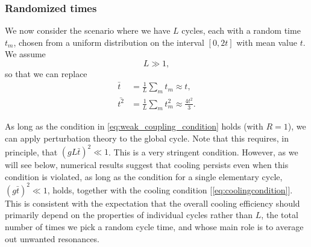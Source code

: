 \documentclass[aps,prx,twocolumn,superscriptaddress,nofootinbib,nolongbibliography,nobalancelastpage,10pt,floatfix]{revtex4-2}
\begin{document}
\subsubsection{Randomized times}
\label{subsubsec:randomized_times}

We now consider the scenario where we have $L$ cycles, each with a random time $t_m$, chosen from a uniform distribution on the interval $[0,2t]$ with mean value $t$. We assume
\begin{equation}
    L \gg 1,
    \label{equationL}
\end{equation}
so that we can replace
\begin{align}
    \bar t    &= \frac{1}{L} \sum_m t_m \approx t,\\
    \bar{t^2} &= \frac{1}{L} \sum_m t^2_m \approx \frac{4t^2}{3}.
\end{align}

As long as the condition in \cref{eq:weak_coupling_condition} holds (with $R=1$), we can apply perturbation theory to the global cycle. Note that this requires, in principle, that $(g L\bar t)^2 \ll 1$. This is a very stringent condition. However, as we will see below, numerical results suggest that cooling persists even when this condition is violated, as long as the condition for a single elementary cycle, $(g \bar t)^2\ll 1$, holds, together with the cooling condition [\cref{eq:coolingcondition}].
This is consistent with the expectation that the overall cooling efficiency should primarily depend on the properties of individual cycles rather than $L$, the total number of times we pick a random cycle time, and whose main role is to average out unwanted resonances.
\end{document}
